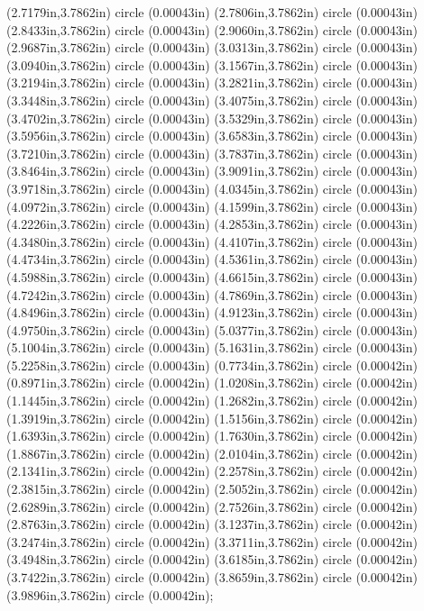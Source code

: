 (2.7179in,3.7862in) circle (0.00043in) (2.7806in,3.7862in) circle (0.00043in) (2.8433in,3.7862in) circle (0.00043in) (2.9060in,3.7862in) circle (0.00043in) (2.9687in,3.7862in) circle (0.00043in) (3.0313in,3.7862in) circle (0.00043in) (3.0940in,3.7862in) circle (0.00043in) (3.1567in,3.7862in) circle (0.00043in) (3.2194in,3.7862in) circle (0.00043in) (3.2821in,3.7862in) circle (0.00043in) (3.3448in,3.7862in) circle (0.00043in) (3.4075in,3.7862in) circle (0.00043in) (3.4702in,3.7862in) circle (0.00043in) (3.5329in,3.7862in) circle (0.00043in) (3.5956in,3.7862in) circle (0.00043in) (3.6583in,3.7862in) circle (0.00043in) (3.7210in,3.7862in) circle (0.00043in) (3.7837in,3.7862in) circle (0.00043in) (3.8464in,3.7862in) circle (0.00043in) (3.9091in,3.7862in) circle (0.00043in) (3.9718in,3.7862in) circle (0.00043in) (4.0345in,3.7862in) circle (0.00043in) (4.0972in,3.7862in) circle (0.00043in) (4.1599in,3.7862in) circle (0.00043in) (4.2226in,3.7862in) circle (0.00043in) (4.2853in,3.7862in) circle (0.00043in) (4.3480in,3.7862in) circle (0.00043in) (4.4107in,3.7862in) circle (0.00043in) (4.4734in,3.7862in) circle (0.00043in) (4.5361in,3.7862in) circle (0.00043in) (4.5988in,3.7862in) circle (0.00043in) (4.6615in,3.7862in) circle (0.00043in) (4.7242in,3.7862in) circle (0.00043in) (4.7869in,3.7862in) circle (0.00043in) (4.8496in,3.7862in) circle (0.00043in) (4.9123in,3.7862in) circle (0.00043in) (4.9750in,3.7862in) circle (0.00043in) (5.0377in,3.7862in) circle (0.00043in) (5.1004in,3.7862in) circle (0.00043in) (5.1631in,3.7862in) circle (0.00043in) (5.2258in,3.7862in) circle (0.00043in) (0.7734in,3.7862in) circle (0.00042in) (0.8971in,3.7862in) circle (0.00042in) (1.0208in,3.7862in) circle (0.00042in) (1.1445in,3.7862in) circle (0.00042in) (1.2682in,3.7862in) circle (0.00042in) (1.3919in,3.7862in) circle (0.00042in) (1.5156in,3.7862in) circle (0.00042in) (1.6393in,3.7862in) circle (0.00042in) (1.7630in,3.7862in) circle (0.00042in) (1.8867in,3.7862in) circle (0.00042in) (2.0104in,3.7862in) circle (0.00042in) (2.1341in,3.7862in) circle (0.00042in) (2.2578in,3.7862in) circle (0.00042in) (2.3815in,3.7862in) circle (0.00042in) (2.5052in,3.7862in) circle (0.00042in) (2.6289in,3.7862in) circle (0.00042in) (2.7526in,3.7862in) circle (0.00042in) (2.8763in,3.7862in) circle (0.00042in) (3.1237in,3.7862in) circle (0.00042in) (3.2474in,3.7862in) circle (0.00042in) (3.3711in,3.7862in) circle (0.00042in) (3.4948in,3.7862in) circle (0.00042in) (3.6185in,3.7862in) circle (0.00042in) (3.7422in,3.7862in) circle (0.00042in) (3.8659in,3.7862in) circle (0.00042in) (3.9896in,3.7862in) circle (0.00042in);
